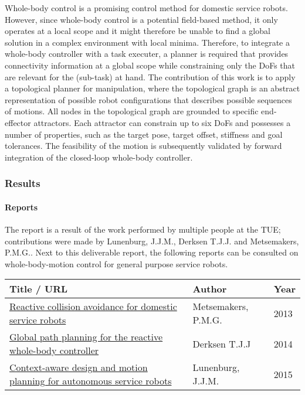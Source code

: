 Whole-body control is a promising control method for domestic service robots. However, since whole-body control is a potential field-based method, it only operates at a local scope and it might therefore be unable to find a global solution in a complex environment with local minima. Therefore, to integrate a whole-body controller with a task executer, a planner is required that
provides connectivity information at a global scope while constraining only the DoFs that are relevant for the (sub-task) at hand.
The contribution of this work is to apply a topological planner for manipulation, where the topological graph is an abstract representation of possible robot configurations that describes possible sequences of motions.
All nodes in the topological graph are grounded to specific end-effector attractors. Each attractor can constrain up to six DoFs and possesses a number of properties, such as the target pose, target offset, stiffness and goal tolerances. The feasibility of the motion is subsequently validated by forward integration of the closed-loop whole-body controller.

\subsubsection{Results}

\paragraph{Reports}
The report is a result of the work performed by multiple people at the TUE; contributions were made by Lunenburg, J.J.M., Derksen T.J.J. and Metsemakers, P.M.G.. Next to this deliverable report, the following reports can be consulted on whole-body-motion control for general purpose service robots.
\begin{longtable}{|p{8.5cm}p{4cm}p{2cm}|}
\hline
\rowcolor[gray]{0.8} \bf Title / URL & \bf Author & \bf Year \\
\hline
\href{http://repository.tue.nl/762360}{Reactive collision avoidance for domestic service robots} & Metsemakers, P.M.G. & 2013 \\
\href{http://repository.tue.nl/778410}{Global path planning for the reactive whole-body controller} & Derksen T.J.J & 2014 \\
\href{http://repository.tue.nl/794842}{Context-aware design and motion planning for autonomous service robots} & Lunenburg, J.J.M. & 2015 \\
\hline
\end{longtable}

